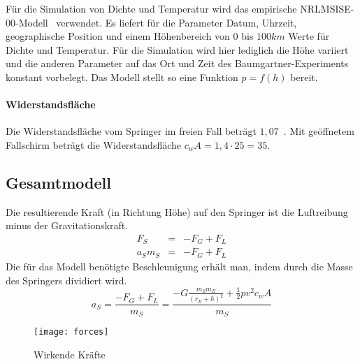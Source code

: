 Für die Simulation von Dichte und Temperatur wird das empirische NRLMSISE-00-Modell~\cite{nrlmsise00:goddardspaceflightcenter} verwendet.
Es liefert für die Parameter Datum, Uhrzeit, geographische Position und einem Höhenbereich von $0$ bis $100km$ Werte für Dichte und Temperatur.
Für die Simulation wird hier lediglich die Höhe variiert und die anderen Parameter auf das Ort und Zeit des Baumgartner-Experiments konstant vorbelegt.
Das Modell stellt so eine Funktion $p=f(h)$ bereit.

\paragraph{Widerstandsfläche}
Die Widerstandsfläche vom Springer im freien Fall beträgt $1,07$~\cite[59]{redbulletin:stratosspecialde}.
Mit geöffnetem Fallschirm beträgt die Widerstandsfläche $c_wA=1,4\cdot25=35$.

\subsection{Gesamtmodell}

Die resultierende Kraft (in Richtung Höhe) auf den Springer ist die Luftreibung minus der Gravitationskraft.
\begin{eqnarray*}
  F_S &=& -F_G+F_L \\
  a_Sm_S &=& -F_G+F_L
\end{eqnarray*}
Die für das Modell benötigte Beschleunigung erhält man, indem durch die Masse des Springers dividiert wird.
\begin{equation}
  a_S = \frac{-F_G+F_L}{m_S} = \frac{-G\frac{m_Sm_E}{(r_E+h)^2}+\frac{1}{2}pv^2c_wA}{m_S}
\end{equation}

\begin{figure}[h]
  \centering
  \texttt{[image: forces]}
  \caption{Wirkende Kräfte}
  \label{fig:forces}
\end{figure}

